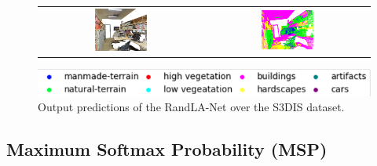 \begin{figure}
\begin{tabular}{cc}
            \includegraphics[width=0.33\textwidth, height=0.18\textheight]{images/seg_output/s3dis_DE/S3DIS_4_RGB.png} &
            \includegraphics[width=0.33\textwidth, height=0.18\textheight]{images/seg_output/s3dis_DE/S3DIS_4_Pred.png}\\
        \end{tabular}
        \includegraphics[scale=0.65]{images/legend.png}
        \caption{Output predictions of the RandLA-Net over the S3DIS dataset.}
        \label{fig:de_s3dis_vis}
    \end{figure}
    \subsection{Maximum Softmax Probability (MSP)}

